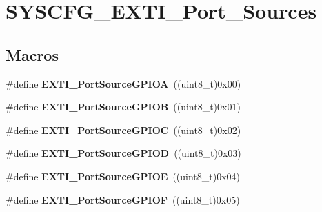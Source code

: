 \hypertarget{group___s_y_s_c_f_g___e_x_t_i___port___sources}{\section{S\-Y\-S\-C\-F\-G\-\_\-\-E\-X\-T\-I\-\_\-\-Port\-\_\-\-Sources}
\label{group___s_y_s_c_f_g___e_x_t_i___port___sources}
}
\subsection*{Macros}
\begin{DoxyCompactItemize}
\item 
\hypertarget{group___s_y_s_c_f_g___e_x_t_i___port___sources_ga66aab57f683213ff74751390162c425d}{\#define {\bfseries E\-X\-T\-I\-\_\-\-Port\-Source\-G\-P\-I\-O\-A}~((uint8\-\_\-t)0x00)}\label{group___s_y_s_c_f_g___e_x_t_i___port___sources_ga66aab57f683213ff74751390162c425d}

\item 
\hypertarget{group___s_y_s_c_f_g___e_x_t_i___port___sources_ga16ab9db3a6cfad6e0204daeea375fadf}{\#define {\bfseries E\-X\-T\-I\-\_\-\-Port\-Source\-G\-P\-I\-O\-B}~((uint8\-\_\-t)0x01)}\label{group___s_y_s_c_f_g___e_x_t_i___port___sources_ga16ab9db3a6cfad6e0204daeea375fadf}

\item 
\hypertarget{group___s_y_s_c_f_g___e_x_t_i___port___sources_ga827bef5afe2be4ac3db7f8f1fc538d6e}{\#define {\bfseries E\-X\-T\-I\-\_\-\-Port\-Source\-G\-P\-I\-O\-C}~((uint8\-\_\-t)0x02)}\label{group___s_y_s_c_f_g___e_x_t_i___port___sources_ga827bef5afe2be4ac3db7f8f1fc538d6e}

\item 
\hypertarget{group___s_y_s_c_f_g___e_x_t_i___port___sources_gaa46454cf1df3cc5c1dfceb460e5345d8}{\#define {\bfseries E\-X\-T\-I\-\_\-\-Port\-Source\-G\-P\-I\-O\-D}~((uint8\-\_\-t)0x03)}\label{group___s_y_s_c_f_g___e_x_t_i___port___sources_gaa46454cf1df3cc5c1dfceb460e5345d8}

\item 
\hypertarget{group___s_y_s_c_f_g___e_x_t_i___port___sources_gab9d4c8777a3f5c9cc90ae844b1c2bbfa}{\#define {\bfseries E\-X\-T\-I\-\_\-\-Port\-Source\-G\-P\-I\-O\-E}~((uint8\-\_\-t)0x04)}\label{group___s_y_s_c_f_g___e_x_t_i___port___sources_gab9d4c8777a3f5c9cc90ae844b1c2bbfa}

\item 
\hypertarget{group___s_y_s_c_f_g___e_x_t_i___port___sources_ga942c607129ec8fa9397417236be932d1}{\#define {\bfseries E\-X\-T\-I\-\_\-\-Port\-Source\-G\-P\-I\-O\-F}~((uint8\-\_\-t)0x05)}\label{group___s_y_s_c_f_g___e_x_t_i___port___sources_ga942c607129ec8fa9397417236be932d1}


\end{DoxyCompactItemize}
